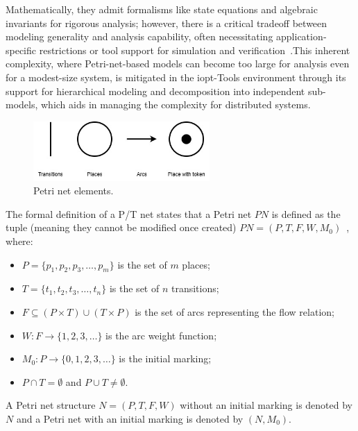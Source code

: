  Mathematically, they admit formalisms like state equations and algebraic invariants for rigorous analysis; however, there is a critical tradeoff between modeling generality and analysis capability, often necessitating application‐specific restrictions or tool support for simulation and verification~\cite{murata}.This inherent complexity, where Petri-net-based models can become too large for analysis even for a modest-size system, is mitigated in the \gls{iopt}-Tools environment through its support for hierarchical modeling and decomposition into independent sub-models, which aids in managing the complexity for distributed systems.


\begin{figure}[htbp]
  \centering
  \includegraphics[width=0.6\textwidth]{Chapters/Figures/petri_image.jpg}
  \caption{Petri net elements.}
  \label{fig:petri_diagrama}
\end{figure}



The formal definition of a P/T net states that a Petri net \( PN \) is defined as the tuple (meaning they cannot be modified once created) \( PN = (P, T, F, W, M_0) \)~\cite{murata}, where:


\begin{itemize}
    \item \( P = \{ p_1, p_2, p_3, \ldots, p_m \} \) is the set of \( m \) places;
    \item \( T = \{ t_1, t_2, t_3, \ldots, t_n \} \) is the set of \( n \) transitions;
    \item \( F \subseteq (P \times T) \cup (T \times P) \) is the set of arcs representing the flow relation;
    \item \( W : F \to \{1,2,3,\ldots\} \) is the arc weight function;
    \item \( M_0 : P \to \{0,1,2,3,\ldots\} \) is the initial marking;
    \item \( P \cap T = \emptyset \) and \( P \cup T \neq \emptyset \).
\end{itemize}

A Petri net structure \( N = (P, T, F, W) \) without an initial marking is denoted by \( N \) and a Petri net with an initial marking is denoted by \( (N, M_0) \).


